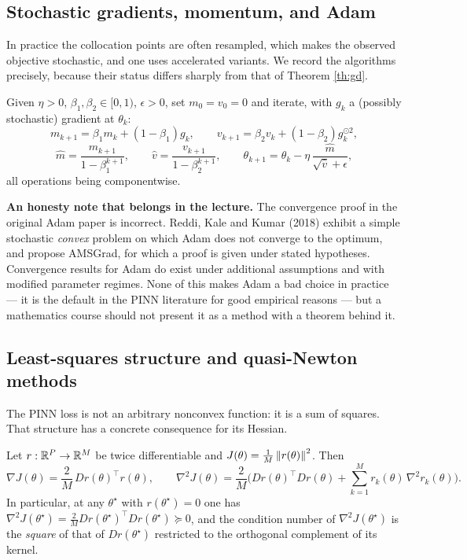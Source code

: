 \documentclass[11pt,a4paper]{article}
\begin{document}
\subsection{Stochastic gradients, momentum, and Adam}

In practice the collocation points are often resampled, which makes the observed objective
stochastic, and one uses accelerated variants. We record the algorithms precisely, because their
status differs sharply from that of Theorem \ref{th:gd}.

\begin{algorithm}\label{alg:adam}
Given $\eta > 0$, $\beta_1, \beta_2 \in [0,1)$, $\epsilon > 0$, set $m_0 = v_0 = 0$ and iterate, with
$g_k$ a (possibly stochastic) gradient at $\theta_k$:
\[
m_{k+1} = \beta_1 m_k + (1-\beta_1) g_k, \qquad
v_{k+1} = \beta_2 v_k + (1-\beta_2) g_k^{\odot 2},
\]
\[
\widehat m = \frac{m_{k+1}}{1 - \beta_1^{k+1}}, \qquad
\widehat v = \frac{v_{k+1}}{1-\beta_2^{k+1}}, \qquad
\theta_{k+1} = \theta_k - \eta\, \frac{\widehat m}{\sqrt{\widehat v} + \epsilon},
\]
all operations being componentwise.
\end{algorithm}

\begin{keybox}
\textbf{An honesty note that belongs in the lecture.} The convergence proof in the original Adam
paper is incorrect. Reddi, Kale and Kumar (2018) exhibit a simple stochastic \emph{convex} problem
on which Adam does not converge to the optimum, and propose AMSGrad, for which a proof is given
under stated hypotheses. Convergence results for Adam do exist under additional assumptions and with
modified parameter regimes. None of this makes Adam a bad choice in practice --- it is the default
in the PINN literature for good empirical reasons --- but a mathematics course should not present it
as a method with a theorem behind it.
\end{keybox}

\subsection{Least-squares structure and quasi-Newton methods}

The PINN loss is not an arbitrary nonconvex function: it is a sum of squares. That structure has a
concrete consequence for its Hessian.

\begin{proposition}\label{prop:gn}
Let $r : \mathbb{R}^P \to \mathbb{R}^M$ be twice differentiable and $J(\theta) = \frac1M\left\lVert r(\theta) \right\rVert^2$. Then
\[
\nabla J(\theta) = \frac{2}{M}\, Dr(\theta)^{\!\top} r(\theta),
\qquad
\nabla^2 J(\theta) = \frac{2}{M}\Big( Dr(\theta)^{\!\top} Dr(\theta) + \sum_{k=1}^M r_k(\theta)\,\nabla^2 r_k(\theta) \Big).
\]
In particular, at any $\theta^\star$ with $r(\theta^\star) = 0$ one has
$\nabla^2 J(\theta^\star) = \frac{2}{M} Dr(\theta^\star)^{\!\top}Dr(\theta^\star) \succeq 0$, and the
condition number of $\nabla^2 J(\theta^\star)$ is the \emph{square} of that of $Dr(\theta^\star)$
restricted to the orthogonal complement of its kernel.
\end{proposition}
\end{document}
